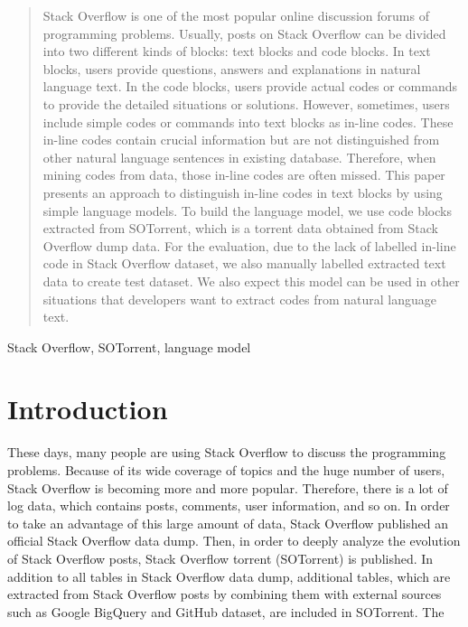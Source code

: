 \documentclass[conference]{IEEEtran}
\begin{document}
\begin{abstract}
 Stack Overflow is one of the most popular online discussion forums of programming problems. Usually, posts on Stack Overflow can be divided into two different kinds of blocks: text blocks and code blocks. In text blocks, users provide questions, answers and explanations in natural language text. In the code blocks, users provide actual codes or commands to provide the detailed situations or solutions. However, sometimes, users include simple codes or commands into text blocks as in-line codes. These in-line codes contain crucial information but are not distinguished from other natural language sentences in existing database. Therefore, when mining codes from  data, those in-line codes are often missed. This paper presents an approach to distinguish in-line codes in text blocks by using simple language models. To build the language model, we use code blocks extracted from SOTorrent, which is a torrent data obtained from Stack Overflow dump data. For the evaluation, due to the lack of labelled in-line code in Stack Overflow dataset, we also manually labelled extracted text data to create test dataset. We also expect this model can be used in other situations that developers want to extract codes from natural language text.
\end{abstract}

\begin{IEEEkeywords}
Stack Overflow, SOTorrent, language model
\end{IEEEkeywords}

\section{Introduction}
These days, many people are using Stack Overflow to discuss the programming problems. Because of its wide coverage of topics and the huge number of users, Stack Overflow is becoming more and more popular. Therefore, there is a lot of log data, which contains posts, comments, user information, and so on. In order to take an advantage of this large amount of data, Stack Overflow published an official Stack Overflow data dump\cite{b1}. Then, in order to deeply analyze the evolution of Stack Overflow posts, Stack Overflow torrent (SOTorrent) is published\cite{b2}\cite{b3}. In addition to all tables in Stack Overflow data dump, additional tables, which are extracted from Stack Overflow posts by combining them with external sources such as Google BigQuery and GitHub dataset, are included in SOTorrent. The 
\end{document}
